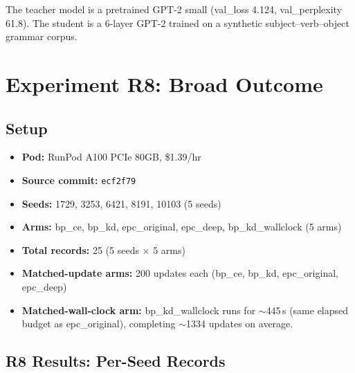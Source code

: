 \documentclass[11pt,a4paper]{article}
\begin{document}
The teacher model is a pretrained GPT-2 small (val\_loss 4.124,
val\_perplexity 61.8).  The student is a 6-layer GPT-2 trained on a
synthetic subject--verb--object grammar corpus.

\section{Experiment R8: Broad Outcome}

\subsection{Setup}

\begin{itemize}[nosep]
  \item \textbf{Pod:} RunPod A100 PCIe 80GB, \$1.39/hr
  \item \textbf{Source commit:} \texttt{ecf2f79}
  \item \textbf{Seeds:} 1729, 3253, 6421, 8191, 10103 (5 seeds)
  \item \textbf{Arms:} bp\_ce, bp\_kd, epc\_original, epc\_deep,
    bp\_kd\_wallclock (5 arms)
  \item \textbf{Total records:} 25 (5 seeds $\times$ 5 arms)
  \item \textbf{Matched-update arms:} 200 updates each (bp\_ce, bp\_kd,
    epc\_original, epc\_deep)
  \item \textbf{Matched-wall-clock arm:} bp\_kd\_wallclock runs for
    $\sim$445\,s (same elapsed budget as epc\_original), completing
    $\sim$1334 updates on average.
\end{itemize}

\subsection{R8 Results: Per-Seed Records}
\end{document}
